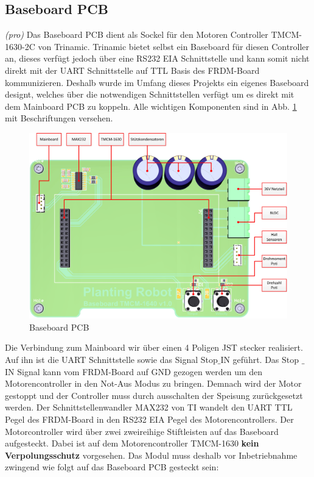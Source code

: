 \subsection{Baseboard PCB}
\textit{(pro)}
Das Baseboard PCB dient als Sockel für den Motoren Controller TMCM-1630-2C von Trinamic. Trinamic bietet selbst ein Baseboard für diesen Controller an, dieses verfügt jedoch über eine RS232 EIA Schnittstelle und kann somit nicht direkt mit der UART Schnittstelle auf TTL Basis des FRDM-Board kommunizieren. Deshalb wurde im Umfang dieses Projekts ein eigenes Baseboard designt, welches über die notwendigen Schnittstellen verfügt um es direkt mit dem Mainboard PCB zu koppeln. Alle wichtigen Komponenten sind in Abb. \ref{fig:Baseboard_3D} mit Beschriftungen versehen.

\begin{figure}[H]
	\includegraphics[width=1\textwidth]{Illustrationen/6-Umsetzung/Baseboard_3D_TOP.jpg}
	\caption{Baseboard PCB}
	\label{fig:Baseboard_3D}
\end{figure}

Die Verbindung zum Mainboard wir über einen 4 Poligen JST stecker realisiert. Auf ihn ist die UART Schnittstelle sowie das Signal Stop$\_$IN geführt. Das Stop $\_$IN Signal kann vom FRDM-Board auf GND gezogen werden um den Motorencontroller in den Not-Aus Modus zu bringen. Demnach wird der Motor gestoppt und der Controller muss durch ausschalten der Speisung zurückgesetzt werden. Der Schnittstellenwandler MAX232 von TI wandelt den UART TTL Pegel des FRDM-Board in den RS232 EIA Pegel des Motorencontrollers. Der Motorcontroller wird über zwei zweireihige Stiftleisten auf das Baseboard aufgesteckt. Dabei ist auf dem Motorencontroller TMCM-1630 \textbf{kein Verpolungsschutz} vorgesehen. Das Modul muss deshalb vor Inbetriebnahme zwingend wie folgt auf das Baseboard PCB gesteckt sein:

